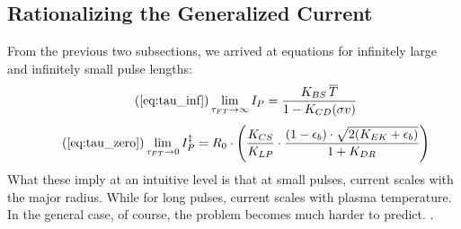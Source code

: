 \subsection{Rationalizing the Generalized Current}

From the previous two subsections, we arrived at equations for infinitely large and infinitely small pulse lengths:
\begin{equation}
	\tag{\ref{eq:tau_inf}}
	\lim_{\tau_{FT} \to \infty} I_P = \frac{ K_{BS} \, \overline T }{ 1 - K_{CD} ( \sigma v ) }
\end{equation}
\begin{equation}
	\tag{\ref{eq:tau_zero}}
	\lim_{ \tau_{FT} \to 0 } I_P^\ddagger = R_0 \cdot \left( \frac{ K_{CS} }{ K_{LP} } \cdot \frac{ ( 1 - \epsilon_b ) \cdot \sqrt{ 2 ( K_{EK} + \epsilon_b ) } }{ 1 + K_{DR} } \right)
\end{equation}
What these imply at an intuitive level is that at small pulses, current scales with the major radius. While for long pulses, current scales with plasma temperature. In the general case, of course, the problem becomes much harder to predict. .

%
